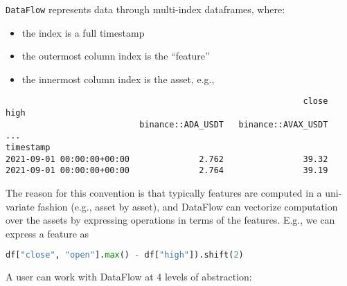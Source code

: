\documentclass[11pt, reqno]{amsart}
\theoremstyle{definition}
\theoremstyle{remark}
\begin{document}
\verb|DataFlow| represents data through multi-index dataframes, where:

\begin{itemize}
  \item the index is a full timestamp
  \item the outermost column index is the ``feature''
  \item the innermost column index is the asset, e.g.,
\end{itemize}

\begin{verbatim}
                                                            close           high
                           binance::ADA_USDT   binance::AVAX_USDT            ...
timestamp
2021-09-01 00:00:00+00:00              2.762                39.32
2021-09-01 00:00:00+00:00              2.764                39.19
\end{verbatim}

The reason for this convention is that typically features are computed
in a uni-variate fashion (e.g., asset by asset), and DataFlow can
vectorize computation over the assets by expressing operations in terms
of the features. E.g., we can express a feature as

\begin{lstlisting}[language=Python]
df["close", "open"].max() - df["high"]).shift(2)
\end{lstlisting}

A user can work with DataFlow at 4 levels of abstraction:
\end{document}
